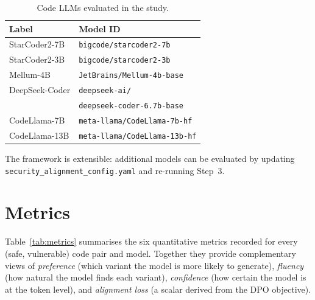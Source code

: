 \documentclass[conference]{IEEEtran}
\begin{document}
\begin{table}[h]
\centering
\caption{Code LLMs evaluated in the study.}
\label{tab:models}
\footnotesize
\begin{tabular}{ll}
\toprule
\textbf{Label} & \textbf{Model ID} \\
\midrule
StarCoder2-7B  & \texttt{bigcode/starcoder2-7b} \\
StarCoder2-3B  & \texttt{bigcode/starcoder2-3b} \\
Mellum-4B      & \texttt{JetBrains/Mellum-4b-base} \\
DeepSeek-Coder & \texttt{deepseek-ai/} \\
               & \quad\texttt{deepseek-coder-6.7b-base} \\
CodeLlama-7B   & \texttt{meta-llama/CodeLlama-7b-hf} \\
CodeLlama-13B  & \texttt{meta-llama/CodeLlama-13b-hf} \\
\bottomrule
\end{tabular}
\end{table}

The framework is extensible: additional models can be evaluated by updating
\texttt{security\_alignment\_config.yaml} and re-running Step~3.

\vspace{0.5cm}
\section{Metrics}

Table~\ref{tab:metrics} summarises the six quantitative metrics recorded for
every (safe, vulnerable) code pair and model. Together they provide
complementary views of \emph{preference} (which variant the model is more
likely to generate), \emph{fluency} (how natural the model finds each variant),
\emph{confidence} (how certain the model is at the token level), and
\emph{alignment loss} (a scalar derived from the DPO objective).
\end{document}
